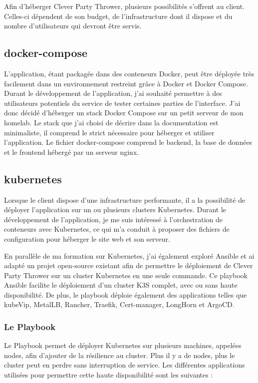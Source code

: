 Afin d'héberger Clever Party Thrower, plusieurs possibilités s'offrent au client.
Celles-ci dépendent de son budget, de l'infrastructure dont il dispose et du nombre d'utilisateurs qui devront être servis.

\subsection{docker-compose}\label{subsec:docker-compose}
L'application, étant packagée dans des conteneurs Docker, peut être déployée très facilement dans un environnement restreint grâce à Docker et Docker Compose.
Durant le développement de l'application, j'ai souhaité permettre à des utilisateurs potentiels du service de tester certaines parties de l'interface.
J'ai donc décidé d'héberger un stack Docker Compose sur un petit serveur de mon homelab.
Le stack que j'ai choisi de décrire dans la documentation est minimaliste, il comprend le strict nécessaire pour héberger et utiliser l'application.
Le fichier docker-compose comprend le backend, la base de données et le frontend hébergé par un serveur nginx.

\subsection{kubernetes}\label{subsec:kubernetes}
Lorsque le client dispose d'une infrastructure performante, il a la possibilité de déployer l'application sur un ou plusieurs clusters Kubernetes.
Durant le développement de l'application, je me suis intéressé à l'orchestration de conteneurs avec Kubernetes, ce qui m'a conduit à proposer des fichiers de configuration pour héberger le site web et son serveur.

En parallèle de ma formation sur Kubernetes, j'ai également exploré Ansible et ai adapté un projet open-source existant afin de permettre le déploiement de Clever Party Thrower sur un cluster Kubernetes en une seule commande.
Ce playbook Ansible facilite le déploiement d'un cluster K3S complet, avec ou sans haute disponibilité.
De plus, le playbook déploie également des applications telles que kubeVip, MetalLB, Rancher, Traefik, Cert-manager, LongHorn et ArgoCD.

\subsubsection{Le Playbook}
Le Playbook permet de déployer Kubernetes sur plusieurs machines, appelées nodes, afin d'ajouter de la résilience au cluster.
Plus il y a de nodes, plus le cluster peut en perdre sans interruption de service.
Les différentes applications utilisées pour permettre cette haute disponibilité sont les suivantes :

